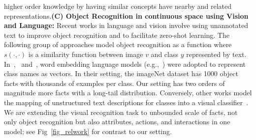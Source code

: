 \documentclass[runningheads]{llncs}
\begin{document}
higher order knowledge by having similar concepts have nearby and related representations.\textbf{(C) Object Recognition in continuous space using Vision and Language:}
Recent works in language and vision involve using  unannotated text to improve object recognition and to facilitate zero-shot learning. The following group of  approaches model object recognition as a function 
where $s(\cdot,\cdot)$ is a similarity function between image $v$ and class $y$ represented by text.   
In~\cite{NIPS13DeViSE},~\cite{norouzi2014zero} and~\cite{NIPS13CMT},  word  embedding language models (e.g.,~\cite{mikolov2013distributed}) were adopted to represent class names as vectors.  
In their setting, the imageNet dataset has 1000 object facts with thousands of examples per class. 
Our setting has two orders of magnitude more facts with a long-tail distribution. Conversely, other works model the mapping of unstructured text descriptions for classes  into a visual classifier~\cite{elhoseiny2013write,ba2015predicting}. %
We are extending the visual recognition task to unbounded scale of facts, 
not only object recognition but also attributes, actions, and interactions in one model; 
see Fig~\ref{fig_relwork} for contrast to our setting. %
\end{document}
